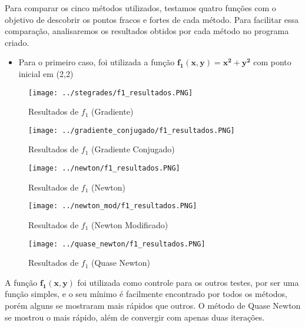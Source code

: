 Para comparar os cinco métodos utilizados, testamos quatro funções com o objetivo de descobrir os pontos fracos e fortes de cada método. Para facilitar essa comparação, analisaremos os resultados obtidos por cada método no programa criado.

\begin{itemize}
	\item Para o primeiro caso, foi utilizada a função $ \mathbf{f_1(x,y) = x^2 + y^2} $ com ponto inicial em (2,2)
\end{itemize}


\begin{figure}[H]
	\centering
	\begin{minipage}{.5\textwidth}
		\centering
		\texttt{[image: ../stegrades/f1\_resultados.PNG]}
		\caption{Resultados de $ f_1 $ (Gradiente)}
		\label{fig:resultados_grad_f1}
	\end{minipage}%
	\begin{minipage}{.5\textwidth}
		\centering
		\texttt{[image: ../gradiente\_conjugado/f1\_resultados.PNG]}
		\caption{Resultados de $ f_1 $ (Gradiente Conjugado)}
		\label{fig:resultados_grad_conj_f1}
	\end{minipage}
\end{figure}

\begin{figure}[H]
	\centering
	\begin{minipage}{.5\textwidth}
		\centering
		\texttt{[image: ../newton/f1\_resultados.PNG]}
		\caption{Resultados de $ f_1 $ (Newton)}
		\label{fig:resultados_newton_f1}
	\end{minipage}%
	\begin{minipage}{.5\textwidth}
		\centering
		\texttt{[image: ../newton\_mod/f1\_resultados.PNG]}
		\caption{Resultados de $ f_1 $ (Newton Modificado)}
		\label{fig:resultados_newton_mod_f1}
	\end{minipage}
\end{figure}

\begin{figure}[H]
	\begin{center}
		\texttt{[image: ../quase\_newton/f1\_resultados.PNG]}   
		\caption{Resultados de $ f_1 $ (Quase Newton)}
		\label{fig:resultados_quase_newton_f1}
	\end{center}
\end{figure}

A função $ \mathbf{f_1(x,y)} $ foi utilizada como controle para os outros testes, por ser uma função simples, e o seu mínimo é facilmente encontrado por todos os métodos, porém alguns se mostraram mais rápidos que outros. O método de Quase Newton se mostrou o mais rápido, além de convergir com apenas duas iterações.


